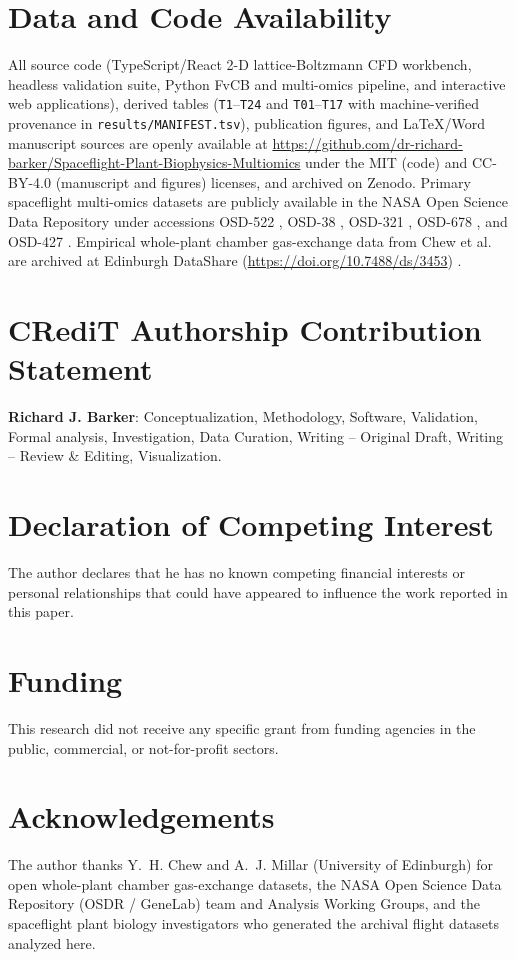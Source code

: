 \documentclass[final,5p,times,twocolumn,numbers,sort&compress]{elsarticle}
\begin{document}
\section*{Data and Code Availability}

All source code (TypeScript/React 2-D lattice-Boltzmann CFD workbench, headless validation suite, Python FvCB and multi-omics pipeline, and interactive web applications), derived tables (\texttt{T1}--\texttt{T24} and \texttt{T01}--\texttt{T17} with machine-verified provenance in \texttt{results/MANIFEST.tsv}), publication figures, and LaTeX/Word manuscript sources are openly available at \url{https://github.com/dr-richard-barker/Spaceflight-Plant-Biophysics-Multiomics} under the MIT (code) and CC-BY-4.0 (manuscript and figures) licenses, and archived on Zenodo. Primary spaceflight multi-omics datasets are publicly available in the NASA Open Science Data Repository \citep{osdr2025} under accessions OSD-522 \citep{osd522}, OSD-38 \citep{osd38}, OSD-321 \citep{osd321}, OSD-678 \citep{osd678}, and OSD-427 \citep{osd427}. Empirical whole-plant chamber gas-exchange data from Chew et al.~\citep{chew2022} are archived at Edinburgh DataShare (\url{https://doi.org/10.7488/ds/3453}) \citep{chew2022data}.

\section*{CRediT Authorship Contribution Statement}
\textbf{Richard J. Barker}: Conceptualization, Methodology, Software, Validation, Formal analysis, Investigation, Data Curation, Writing -- Original Draft, Writing -- Review \& Editing, Visualization.

\section*{Declaration of Competing Interest}
The author declares that he has no known competing financial interests or personal relationships that could have appeared to influence the work reported in this paper.

\section*{Funding}
This research did not receive any specific grant from funding agencies in the public, commercial, or not-for-profit sectors.

\section*{Acknowledgements}
The author thanks Y.~H. Chew and A.~J. Millar (University of Edinburgh) for open whole-plant chamber gas-exchange datasets, the NASA Open Science Data Repository (OSDR / GeneLab) team and Analysis Working Groups, and the spaceflight plant biology investigators who generated the archival flight datasets analyzed here.



\end{document}
